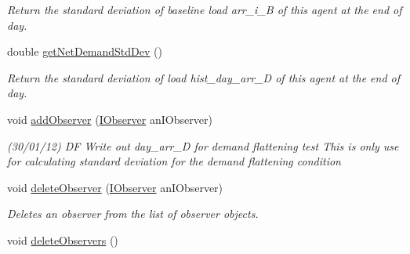 \begin{DoxyCompactItemize}
\begin{DoxyCompactList}\small\item\em Return the standard deviation of baseline load {\ttfamily arr\-\_\-i\-\_\-\-B} of this agent at the end of day. \end{DoxyCompactList}\item 
\hypertarget{classuk_1_1ac_1_1dmu_1_1iesd_1_1cascade_1_1agents_1_1aggregators_1_1_aggregator_agent_a2f9016f4af8c5b5356db30caefcca9c6}{double \hyperlink{classuk_1_1ac_1_1dmu_1_1iesd_1_1cascade_1_1agents_1_1aggregators_1_1_aggregator_agent_a2f9016f4af8c5b5356db30caefcca9c6}{get\-Net\-Demand\-Std\-Dev} ()}\label{classuk_1_1ac_1_1dmu_1_1iesd_1_1cascade_1_1agents_1_1aggregators_1_1_aggregator_agent_a2f9016f4af8c5b5356db30caefcca9c6}

\begin{DoxyCompactList}\small\item\em Return the standard deviation of load {\ttfamily hist\-\_\-day\-\_\-arr\-\_\-\-D} of this agent at the end of day. \end{DoxyCompactList}\item 
void \hyperlink{classuk_1_1ac_1_1dmu_1_1iesd_1_1cascade_1_1agents_1_1aggregators_1_1_aggregator_agent_af1d3c6ccad69e49e95aa9393af89d8af}{add\-Observer} (\hyperlink{interfaceuk_1_1ac_1_1dmu_1_1iesd_1_1cascade_1_1util_1_1_i_observer}{I\-Observer} an\-I\-Observer)
\begin{DoxyCompactList}\small\item\em (30/01/12) D\-F Write out {\ttfamily day\-\_\-arr\-\_\-\-D} for demand flattening test This is only use for calculating standard deviation for the demand flattening condition \end{DoxyCompactList}\item 
void \hyperlink{classuk_1_1ac_1_1dmu_1_1iesd_1_1cascade_1_1agents_1_1aggregators_1_1_aggregator_agent_a878c881dda87bb948e9e36b19cbbb889}{delete\-Observer} (\hyperlink{interfaceuk_1_1ac_1_1dmu_1_1iesd_1_1cascade_1_1util_1_1_i_observer}{I\-Observer} an\-I\-Observer)
\begin{DoxyCompactList}\small\item\em Deletes an observer from the list of observer objects. \end{DoxyCompactList}\item 
\hypertarget{classuk_1_1ac_1_1dmu_1_1iesd_1_1cascade_1_1agents_1_1aggregators_1_1_aggregator_agent_ad9f740398e56b3e4220e3bc731251e83}{void \hyperlink{classuk_1_1ac_1_1dmu_1_1iesd_1_1cascade_1_1agents_1_1aggregators_1_1_aggregator_agent_ad9f740398e56b3e4220e3bc731251e83}{delete\-Observers} ()}\label{classuk_1_1ac_1_1dmu_1_1iesd_1_1cascade_1_1agents_1_1aggregators_1_1_aggregator_agent_ad9f740398e56b3e4220e3bc731251e83}


\end{DoxyCompactItemize}
